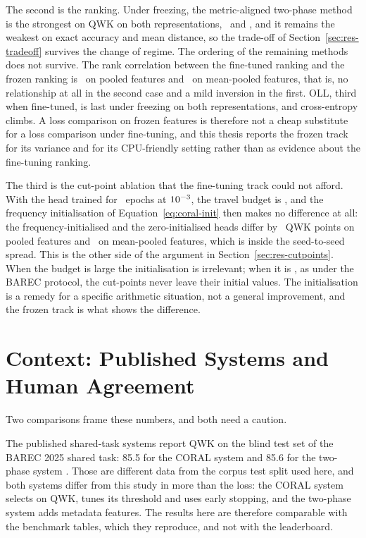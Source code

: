 The second is the ranking. Under freezing, the metric-aligned two-phase method is the strongest
on QWK on both representations, \cpuPoolerdevQwkSoftqwk\ and \cpuMeandevQwkSoftqwk, and it
remains the weakest on exact accuracy and mean distance, so the trade-off of
Section~\ref{sec:res-tradeoff} survives the change of regime. The ordering of the remaining
methods does not survive. The rank correlation between the fine-tuned ranking and the frozen
ranking is \cpuSpearmanPooler\ on pooled features and \cpuSpearmanMean\ on mean-pooled
features, that is, no relationship at all in the second case and a mild inversion in the first.
OLL, third when fine-tuned, is last under freezing on both representations, and cross-entropy
climbs. A loss comparison on frozen features is therefore not a cheap substitute for a loss
comparison under fine-tuning, and this thesis reports the frozen track for its variance and for
its CPU-friendly setting rather than as evidence about the fine-tuning ranking.

The third is the cut-point ablation that the fine-tuning track could not afford. With the head
trained for \cpuEpochs\ epochs at $10^{-3}$, the travel budget is \cpuLrSum, and the
frequency initialisation of Equation~\ref{eq:coral-init} then makes no difference at all:
the frequency-initialised and the zero-initialised heads differ by \cpuZeroInitDiffPooler\ QWK
points on pooled features and \cpuZeroInitDiffMean\ on mean-pooled features, which is inside
the seed-to-seed spread. This is the other side of
the argument in Section~\ref{sec:res-cutpoints}. When the budget is large the initialisation is
irrelevant; when it is \lrSumEncoder, as under the BAREC protocol, the cut-points never leave
their initial values. The initialisation is a remedy for a specific arithmetic situation, not a
general improvement, and the frozen track is what shows the difference.

\section{Context: Published Systems and Human Agreement}
\label{sec:res-context}

Two comparisons frame these numbers, and both need a caution.

The published shared-task systems report QWK on the blind test set of the BAREC 2025 shared
task: 85.5 for the CORAL system and 85.6 for the two-phase system
\cite{nazzal2025zai,trigui2025stbw}. Those are different data from the corpus test split used
here, and both systems differ from this study in more than the loss: the CORAL system selects
on QWK, tunes its threshold and uses early stopping, and the two-phase system adds metadata
features. The results here are therefore comparable with the benchmark tables, which they
reproduce, and not with the leaderboard.

